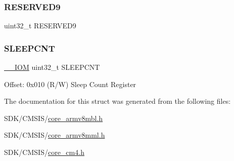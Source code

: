 \mbox{\label{struct_d_w_t___type_add96c3a797009b4a2ff376fb8b5ef965}} 
\subsubsection{\texorpdfstring{R\+E\+S\+E\+R\+V\+E\+D9}{RESERVED9}}
{\footnotesize\ttfamily uint32\+\_\+t R\+E\+S\+E\+R\+V\+E\+D9}

\mbox{\label{struct_d_w_t___type_aafa1400cd3168b21652b86599ad3ed83}} 
\subsubsection{\texorpdfstring{S\+L\+E\+E\+P\+C\+NT}{SLEEPCNT}}
{\footnotesize\ttfamily \mbox{\hyperlink{core__cm4_8h_ab6caba5853a60a17e8e04499b52bf691}{\+\_\+\+\_\+\+I\+OM}} uint32\+\_\+t S\+L\+E\+E\+P\+C\+NT}

Offset\+: 0x010 (R/W) Sleep Count Register 

The documentation for this struct was generated from the following files\+:\begin{DoxyCompactItemize}
\item 
S\+D\+K/\+C\+M\+S\+I\+S/\mbox{\hyperlink{core__armv8mbl_8h}{core\+\_\+armv8mbl.\+h}}\item 
S\+D\+K/\+C\+M\+S\+I\+S/\mbox{\hyperlink{core__armv8mml_8h}{core\+\_\+armv8mml.\+h}}\item 
S\+D\+K/\+C\+M\+S\+I\+S/\mbox{\hyperlink{core__cm4_8h}{core\+\_\+cm4.\+h}}\end{DoxyCompactItemize}
